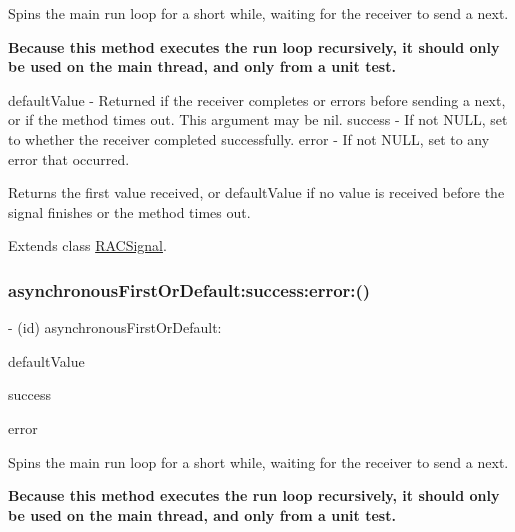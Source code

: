 Spins the main run loop for a short while, waiting for the receiver to send a {\ttfamily next}.

{\bfseries Because this method executes the run loop recursively, it should only be used on the main thread, and only from a unit test.}

default\+Value -\/ Returned if the receiver completes or errors before sending a {\ttfamily next}, or if the method times out. This argument may be nil. success -\/ If not N\+U\+LL, set to whether the receiver completed successfully. error -\/ If not N\+U\+LL, set to any error that occurred.

Returns the first value received, or {\ttfamily default\+Value} if no value is received before the signal finishes or the method times out. 

Extends class \mbox{\hyperlink{interface_r_a_c_signal_a477114852c0e761a023a35e35ccc1784}{R\+A\+C\+Signal}}.

\mbox{\label{category_r_a_c_signal_07_testing_08_a477114852c0e761a023a35e35ccc1784}} 
\subsubsection{\texorpdfstring{asynchronous\+First\+Or\+Default\+:success\+:error\+:()}{asynchronousFirstOrDefault:success:error:()}\hspace{0.1cm}{\footnotesize\ttfamily [3/3]}}
{\footnotesize\ttfamily -\/ (id) asynchronous\+First\+Or\+Default\+: \begin{DoxyParamCaption}\item[{(id)}]{default\+Value }\item[{success:(B\+O\+OL $\ast$)}]{success }\item[{error:(N\+S\+Error $\ast$$\ast$)}]{error }\end{DoxyParamCaption}}

Spins the main run loop for a short while, waiting for the receiver to send a {\ttfamily next}.

{\bfseries Because this method executes the run loop recursively, it should only be used on the main thread, and only from a unit test.}

